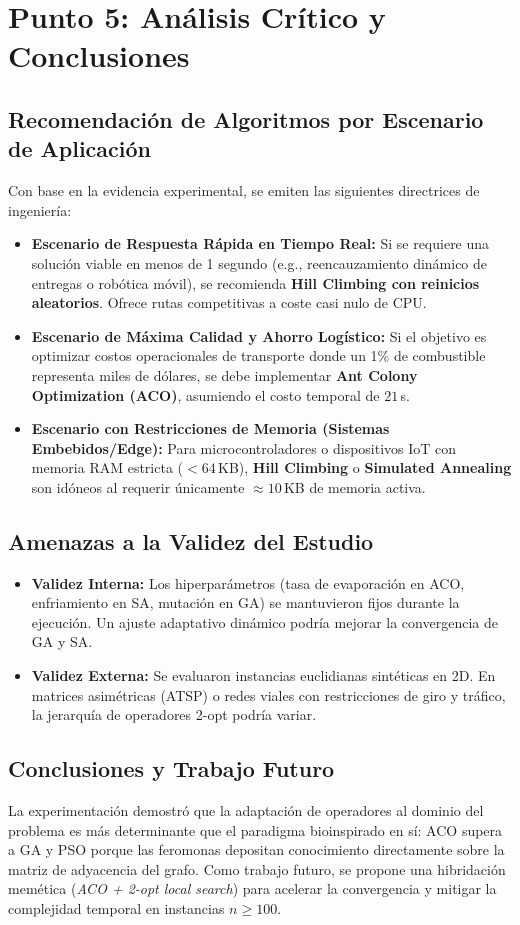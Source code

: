 \documentclass[11pt, a4paper]{article}
\begin{document}
\section{Punto 5: Análisis Crítico y Conclusiones}

\subsection{Recomendación de Algoritmos por Escenario de Aplicación}
Con base en la evidencia experimental, se emiten las siguientes directrices de ingeniería:
\begin{itemize}
    \item \textbf{Escenario de Respuesta Rápida en Tiempo Real:} Si se requiere una solución viable en menos de 1 segundo (e.g., reencauzamiento dinámico de entregas o robótica móvil), se recomienda \textbf{Hill Climbing con reinicios aleatorios}. Ofrece rutas competitivas a coste casi nulo de CPU.
    \item \textbf{Escenario de Máxima Calidad y Ahorro Logístico:} Si el objetivo es optimizar costos operacionales de transporte donde un 1\% de combustible representa miles de dólares, se debe implementar \textbf{Ant Colony Optimization (ACO)}, asumiendo el costo temporal de $21$\,s.
    \item \textbf{Escenario con Restricciones de Memoria (Sistemas Embebidos/Edge):} Para microcontroladores o dispositivos IoT con memoria RAM estricta ($< 64$\,KB), \textbf{Hill Climbing} o \textbf{Simulated Annealing} son idóneos al requerir únicamente $\approx 10$\,KB de memoria activa.
\end{itemize}

\subsection{Amenazas a la Validez del Estudio}
\begin{itemize}
    \item \textbf{Validez Interna:} Los hiperparámetros (tasa de evaporación en ACO, enfriamiento en SA, mutación en GA) se mantuvieron fijos durante la ejecución. Un ajuste adaptativo dinámico podría mejorar la convergencia de GA y SA.
    \item \textbf{Validez Externa:} Se evaluaron instancias euclidianas sintéticas en 2D. En matrices asimétricas (ATSP) o redes viales con restricciones de giro y tráfico, la jerarquía de operadores 2-opt podría variar.
\end{itemize}

\subsection{Conclusiones y Trabajo Futuro}
La experimentación demostró que la adaptación de operadores al dominio del problema es más determinante que el paradigma bioinspirado en sí: ACO supera a GA y PSO porque las feromonas depositan conocimiento directamente sobre la matriz de adyacencia del grafo. Como trabajo futuro, se propone una hibridación memética (\textit{ACO + 2-opt local search}) para acelerar la convergencia y mitigar la complejidad temporal en instancias $n \ge 100$.
\end{document}
